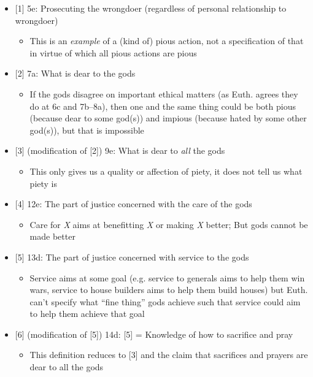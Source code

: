 \documentclass[11pt]{article}
\begin{document}
\begin{itemize}

\item{[1] 5e: Prosecuting the wrongdoer (regardless of personal relationship to wrongdoer)}

\begin{itemize}\item{This is an \emph{example} of a (kind of) pious action, not a specification of that in virtue of which all pious actions are pious}\end{itemize}

\item{[2] 7a: What is dear to the gods}

\begin{itemize}\item{If the gods disagree on important ethical matters (as Euth. agrees they do at 6c and 7b--8a), then one and the same thing could be both pious (because dear to some god(s)) and impious (because hated by some other god(s)), but that is impossible}\end{itemize}

\item{[3] (modification of [2]) 9e: What is dear to \emph{all} the gods}

\begin{itemize}\item{This only gives us a quality or affection of piety, it does not tell us what piety is}\end{itemize}

\item{[4] 12e: The part of justice concerned with the care of the gods}

\begin{itemize}\item{Care for \emph{X} aims at benefitting \emph{X} or making \emph{X} better; But gods cannot be made better}\end{itemize}

\item{[5] 13d: The part of justice concerned with service to the gods}

\begin{itemize}\item{Service aims at some goal (e.g. service to generals aims to help them win wars, service to house builders aims to help them build houses) but Euth. can't specify what ``fine thing'' gods achieve such that service could aim to help them achieve that goal}\end{itemize} 

\item{[6] (modification of [5]) 14d: [5] = Knowledge of how to sacrifice and pray}

\begin{itemize}\item{This definition reduces to [3] and the claim that sacrifices and prayers are dear to all the gods}\end{itemize}

\end{itemize}
\end{document}
